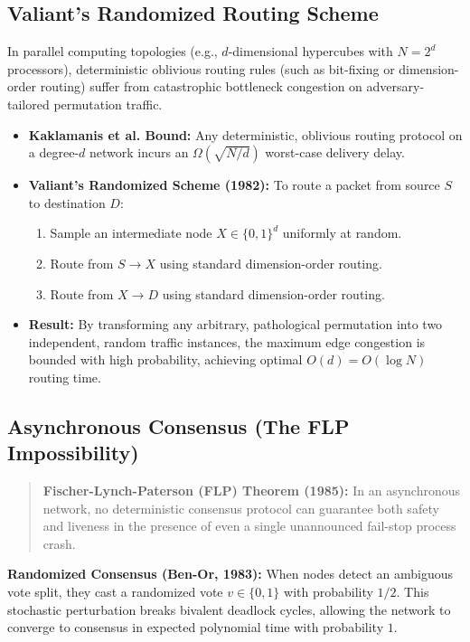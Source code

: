 \documentclass[11pt,a4paper]{article}
\begin{document}
\subsection{Valiant's Randomized Routing Scheme}
In parallel computing topologies (e.g., $d$-dimensional hypercubes with $N = 2^d$ processors), deterministic oblivious routing rules (such as bit-fixing or dimension-order routing) suffer from catastrophic bottleneck congestion on adversary-tailored permutation traffic.

\begin{itemize}
    \item \textbf{Kaklamanis et al. Bound:} Any deterministic, oblivious routing protocol on a degree-$d$ network incurs an $\Omega(\sqrt{N/d})$ worst-case delivery delay.
    \item \textbf{Valiant's Randomized Scheme (1982):} To route a packet from source $S$ to destination $D$:
    \begin{enumerate}
        \item Sample an intermediate node $X \in \{0, 1\}^d$ uniformly at random.
        \item Route from $S \to X$ using standard dimension-order routing.
        \item Route from $X \to D$ using standard dimension-order routing.
    \end{enumerate}
    \item \textbf{Result:} By transforming any arbitrary, pathological permutation into two independent, random traffic instances, the maximum edge congestion is bounded with high probability, achieving optimal $O(d) = O(\log N)$ routing time.
\end{itemize}

\subsection{Asynchronous Consensus (The FLP Impossibility)}
\begin{quote}
\textbf{Fischer-Lynch-Paterson (FLP) Theorem (1985):} In an asynchronous network, no deterministic consensus protocol can guarantee both safety and liveness in the presence of even a single unannounced fail-stop process crash.
\end{quote}
\textbf{Randomized Consensus (Ben-Or, 1983):} When nodes detect an ambiguous vote split, they cast a randomized vote $v \in \{0, 1\}$ with probability $1/2$. This stochastic perturbation breaks bivalent deadlock cycles, allowing the network to converge to consensus in expected polynomial time with probability $1$.
\end{document}
